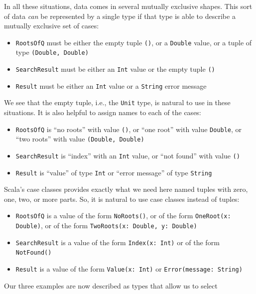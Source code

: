 In all these situations, data comes in several mutually exclusive
shapes. This sort of data \emph{can} be represented by a single type
if that type is able to describe a mutually exclusive set of cases:
\begin{itemize}
\item \lstinline!RootsOfQ! must be either the empty tuple \lstinline!()!,
or a \lstinline!Double! value, or a tuple of type \lstinline!(Double, Double)!
\item \lstinline!SearchResult! must be either an \lstinline!Int! value
or the empty tuple \lstinline!()!
\item \lstinline!Result! must be either an \lstinline!Int! value or a
\lstinline!String! error message
\end{itemize}
We see that the empty tuple, i.e., the \lstinline!Unit! type, is
natural to use in these situations. It is also helpful to assign names
to each of the cases:
\begin{itemize}
\item \lstinline!RootsOfQ! is \textsf{``}no roots\textsf{''} with value \lstinline!()!,
or \textsf{``}one root\textsf{''} with value \lstinline!Double!, or \textsf{``}two roots\textsf{''}
with value \lstinline!(Double, Double)!
\item \lstinline!SearchResult! is \textsf{``}index\textsf{''} with an \lstinline!Int!
value, or \textsf{``}not found\textsf{''} with value \lstinline!()!
\item \lstinline!Result! is \textsf{``}value\textsf{''} of type \lstinline!Int! or \textsf{``}error
message\textsf{''} of type \lstinline!String!
\end{itemize}
Scala\textsf{'}s case classes provides exactly what we need here \textemdash{}
named tuples with zero, one, two, or more parts. So, it is natural
to use case classes instead of tuples:
\begin{itemize}
\item \lstinline!RootsOfQ! is a value of the form \lstinline!NoRoots()!,
or of the form \lstinline!OneRoot(x: Double)!, or of the form \lstinline!TwoRoots(x: Double, y: Double)!
\item \lstinline!SearchResult! is a value of the form \lstinline!Index(x: Int)!
or of the form \lstinline!NotFound()!
\item \lstinline!Result! is a value of the form \lstinline!Value(x: Int)!
or \lstinline!Error(message: String)!
\end{itemize}
Our three examples are now described as types that allow us to select
